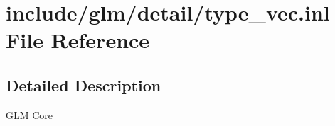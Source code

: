\hypertarget{type__vec_8inl}{}\section{include/glm/detail/type\+\_\+vec.inl File Reference}
\label{type__vec_8inl}


\subsection{Detailed Description}
\hyperlink{group__core}{G\+LM Core} 